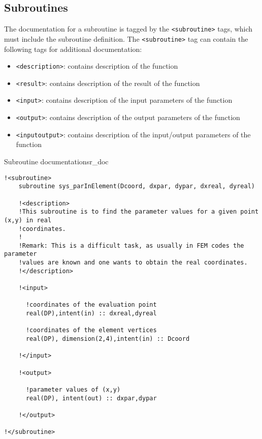 \subsection{Subroutines}

The documentation for a subroutine is tagged by the \verb+<subroutine>+ tags, which
must include the subroutine definition. The \verb+<subroutine>+ tag 
can contain the following tags for additional documentation:

\begin{itemize}
\item \verb+<description>+: contains description of the function
\item \verb+<result>+: contains description of the result of the function
\item \verb+<input>+: contains description of the input parameters of the function
\item \verb+<output>+: contains description of the output parameters of the function
\item \verb+<inputoutput>+: contains description of the input/output parameters of the function
\end{itemize}

\begin{code}{Subroutine documentation}{sr_doc}
\begin{verbatim}
!<subroutine>
    subroutine sys_parInElement(Dcoord, dxpar, dypar, dxreal, dyreal)

    !<description>
    !This subroutine is to find the parameter values for a given point (x,y) in real
    !coordinates.
    !
    !Remark: This is a difficult task, as usually in FEM codes the parameter 
    !values are known and one wants to obtain the real coordinates.
    !</description>

    !<input>

      !coordinates of the evaluation point
      real(DP),intent(in) :: dxreal,dyreal

      !coordinates of the element vertices
      real(DP), dimension(2,4),intent(in) :: Dcoord

    !</input>

    !<output>

      !parameter values of (x,y)
      real(DP), intent(out) :: dxpar,dypar

    !</output>

!</subroutine>

\end{verbatim}
\end{code}

